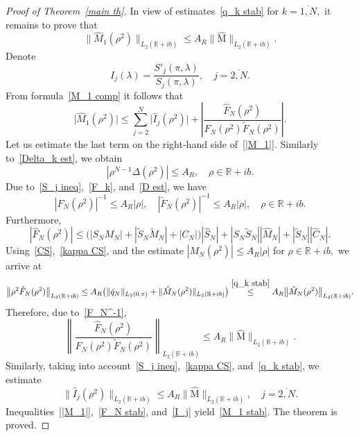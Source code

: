 \documentclass[a4paper, 12pt] {article}
\theoremstyle{plain}
\theoremstyle{remark}
\theoremstyle{plain}
\theoremstyle{definition}
\numberwithin{equation}{section}
\begin{document}
\begin{proof}[Proof of Theorem~\ref{main th}]
In view of estimates~\eqref{q_k stab} for $k=\overline{1, N},$ it remains to prove that
\begin{equation} \label{M_1 stab}
\big\| \hat M_1(\rho^2)\big\|_{L_2({\mathbb R}+ib)} \le A_R \big\| \hat {\mathrm M}\big\|_{L_2({\mathbb R}+ib)}.
\end{equation}
Denote
$$I_j(\lambda) = \frac{S'_j(\pi, \lambda)}{S_j(\pi, \lambda)}, \quad j=\overline{2, N}.$$
From formula~\eqref{M_1 comp} it follows that
\begin{equation} \label{|M_1|}
\big|\hat M_1(\rho^2)\big| \le \sum_{j=2}^N \big|\hat I_j(\rho^2)\big| + \left|\frac{\hat F_N(\rho^2)}{F_N(\rho^2) \tilde F_N(\rho^2)}\right|.
\end{equation}
Let us estimate the last term on the right-hand side of~\eqref{|M_1|}. Similarly to~\eqref{Delta_k est}, we obtain
\begin{equation} \label{D est}
|\rho^{N-1} \Delta(\rho^2)| \le A_R, \quad \rho \in {\mathbb R} + ib.
\end{equation}
Due to~\eqref{S_j ineq},~\eqref{F_k}, and~\eqref{D est}, we have
\begin{equation}
|F_N(\rho^2)|^{-1} \le A_R|\rho|, \quad |\tilde F_N(\rho^2)|^{-1} \le A_R|\rho|, \quad \rho \in {\mathbb R}+ib.
\label{F_N^-1}
\end{equation}
Furthermore,
$$|\hat F_N(\rho^2)| \le \big(|S_N M_N| + |\tilde S_N \tilde M_N| +|C_N|\big)|\hat S_N| + |S_N \tilde S_N||\hat M_N| + |\tilde S_N||\hat C_N|. $$
Using~\eqref{CS},~\eqref{kappa CS}, and the estimate $|M_N(\rho^2)| \le A_R |\rho|$ for $\rho \in {\mathbb R}+ib,$ we arrive at
$$
\big\| \rho^2 \hat F_N(\rho^2) \big\|_{L_2({\mathbb R}+ib)} \le A_R \big(\| \hat q_N\|_{L_2(0, \pi)} + \| \hat M_N(\rho^2)\|_{L_2({\mathbb R}+ib)}\big)
\overset{\eqref{q_k stab}}{\le} A_R \big\| \hat M_N(\rho^2)\big\|_{L_2({\mathbb R}+ib)}.
$$
Therefore, due to~\eqref{F_N^-1},
\begin{equation}
\left\| \frac{\hat F_N(\rho^2)}{ F_N(\rho^2) \tilde F_N(\rho^2)}\right\|_{L_2({\mathbb R}+ ib)} \le A_R\big\| \hat{\mathrm M}\big\|_{L_2({\mathbb R}+ib)}.
 \label{F_N stab}
\end{equation}
Similarly, taking into account~\eqref{S_j ineq},~\eqref{kappa CS}, and~\eqref{q_k stab}, we estimate
\begin{equation} \label{I_j}
 \big\|\hat I_j(\rho^2)\big\|_{L_2({\mathbb R}+ib)} \le  A_R\big\| \hat{\mathrm M}\big\|_{L_2({\mathbb R}+ib)}, \quad j=\overline{2, N}.
\end{equation}
Inequalities~\eqref{|M_1|},~\eqref{F_N stab}, and~\eqref{I_j} yield~\eqref{M_1 stab}.
The theorem is proved.
\end{proof}
\end{document}
